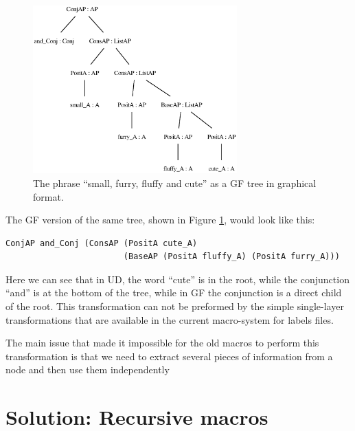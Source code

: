 \begin{figure}
    \centering
    \includegraphics[width=0.7\textwidth]{figure/cute_gf.eps}
    \caption{The phrase ``small, furry, fluffy and cute'' as a GF tree in graphical format. }
    \label{fig:gf_cute}
\end{figure}

The GF version of the same tree, shown in Figure \ref{fig:gf_cute}, would look like this:

\begin{verbatim}
ConjAP and_Conj (ConsAP (PositA cute_A)
                        (BaseAP (PositA fluffy_A) (PositA furry_A)))
\end{verbatim}
Here we can see that in UD, the word ``cute'' is in the root, while the conjunction ``and'' is at the bottom of the tree, while in GF the conjunction is a direct child of the root. This transformation can not be preformed by the simple single-layer transformations that are available in the current macro-system for labels files.

The main issue that made it impossible for the old macros to perform this transformation is that we need to extract several pieces of information from a node and then use them independently

\section{Solution: Recursive macros}

%
%
%
%

